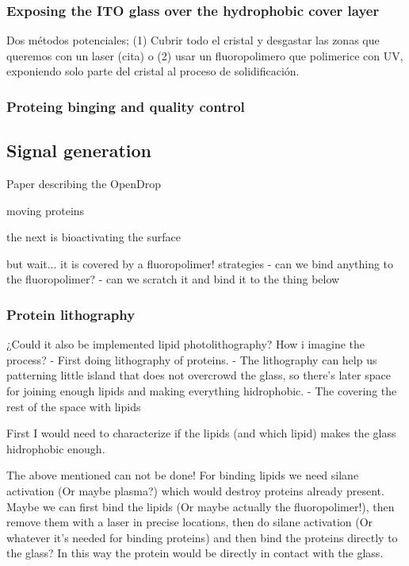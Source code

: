 \documentclass[12pt]{article}
\begin{document}
\subsubsection*{Exposing the ITO glass over the hydrophobic cover layer}
Dos métodos potenciales; (1) Cubrir todo el cristal y desgastar las zonas que queremos con un laser (cita) o (2) usar un fluoropolimero que
polimerice con UV, exponiendo solo parte del cristal al proceso de solidificación.
\subsubsection*{Proteing binging and quality control}
\subsection*{Signal generation}

Paper describing the OpenDrop

moving proteins

\cite{strale_multiprotein_2016}

the next is bioactivating the surface

but wait... it is covered by a fluoropolimer!
strategies
 - can we bind anything to the fluoropolimer?
  - can we scratch it and bind it to the thing below


\subsubsection*{Protein lithography}
¿Could it also be implemented lipid photolithography?
How i imagine the process?
 - First doing lithography of proteins. 
      - The lithography can help us patterning little island that does not overcrowd the glass, so there's later space for joining enough lipids and making everything hidrophobic.
 - The covering the rest of the space with lipids

 First I would need to characterize if the lipids (and which lipid) makes the glass hidrophobic enough.

 The above mentioned can not be done! For binding lipids we need silane activation (Or maybe plasma?) which would destroy proteins already present.
 Maybe we can first bind the lipids (Or maybe actually the fluoropolimer!), then remove them with a laser in precise locations, then do silane activation 
 (Or whatever it's needed for binding proteins) and then bind the proteins directly to the glass? In this way the protein would be directly in contact with the glass.
\end{document}
